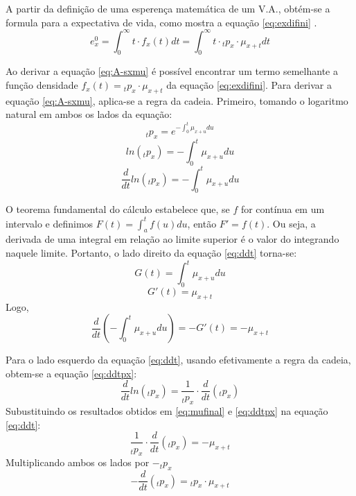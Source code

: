 A partir da definição de uma esperença matemática de um V.A., obtém-se a formula para a expectativa de vida, como mostra a equação \ref{eq:exdifini} \cite{bowers2006}.
\begin{equation}
    e_x^0=\int_0^\infty t \cdot  f_x(t)dt = \int_0^\infty t \cdot {}_{t}p_x \cdot \mu_{x+t} dt 
    \label{eq:exdifini}
\end{equation}

Ao derivar a equação \ref{eq:A-sxmu} é possível encontrar um termo semelhante a função densidade $f_x(t) = {}_{t}p_x \cdot \mu_{x+t}$ da equação \ref{eq:exdifini}. Para derivar a equação \ref{eq:A-sxmu}, aplica-se a regra da cadeia. Primeiro, tomando o logaritmo natural em ambos os lados da equação:
\begin{equation}
    {}_tp_x=e^{-\int_0^t\mu_{x+u}du}
\end{equation}
\begin{equation}
    ln({}_tp_x)=-\int_0^t\mu_{x+u}du
\end{equation}
\begin{equation}
    \frac{d}{dt}ln({}_tp_x)=-\int_0^t\mu_{x+u}du
    \label{eq:ddt}
\end{equation}

O teorema fundamental do cálculo estabelece que, se $f$ for contínua em um intervalo e definimos $F(t) = \int_{a}^{t}f(u)du$, então $F'=f(t)$. Ou seja, a derivada de uma integral em relação ao limite superior é o valor do integrando naquele limite. Portanto, o lado direito da equação \ref{eq:ddt} torna-se:
\begin{equation}
    G(t) = \int_0^t\mu_{x+u}du
\end{equation}
\begin{equation}
    G'(t) = \mu_{x+t}
\end{equation}
Logo,
\begin{equation}
    \frac{d}{dt} \left(-\int_0^t\mu_{x+u}du\right) = -G'(t) = -\mu_{x+t}
    \label{eq:mufinal}
\end{equation}

Para o lado esquerdo da equação \ref{eq:ddt}, usando efetivamente a regra da cadeia, obtem-se a equação \ref{eq:ddtpx}:
\begin{equation}
    \frac{d}{dt}ln({}_tp_x) = \frac{1}{{}_tp_x} \cdot \frac{d}{dt}({}_tp_x)
    \label{eq:ddtpx}
\end{equation}
Subustituindo os resultados obtidos em \ref{eq:mufinal} e \ref{eq:ddtpx} na equação \ref{eq:ddt}:
\begin{equation}
    \frac{1}{{}_tp_x} \cdot \frac{d}{dt}({}_tp_x) = -\mu_{x+t}
    \label{eq:pxfinales}
\end{equation}
Multiplicando ambos os lados por $-{}_{t}p_{x}$
\begin{equation}
    -\frac{d}{dt}({}_tp_x) = {}_tp_x \cdot \mu_{x+t}
    \label{eq:finales}
\end{equation}

